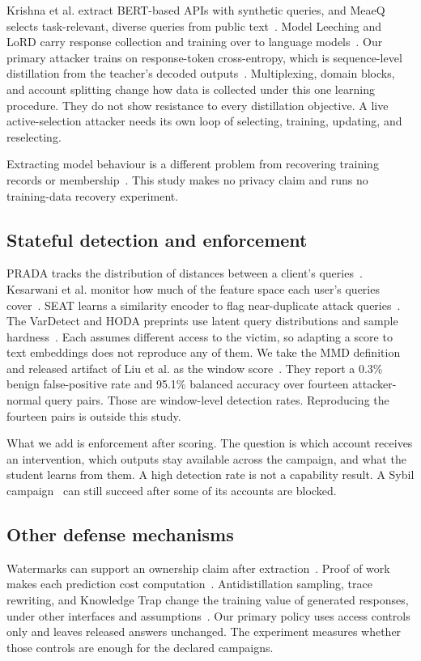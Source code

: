 \documentclass[journal]{IEEEtran}
\begin{document}
Krishna et al. extract BERT-based APIs with synthetic queries, and MeaeQ selects task-relevant, diverse queries from public text~\cite{krishna2020thieves,dai2023meaeq}. Model Leeching and LoRD carry response collection and training over to language models~\cite{birch2023leeching,liang2025lord}. Our primary attacker trains on response-token cross-entropy, which is sequence-level distillation from the teacher's decoded outputs~\cite{kim2016sequence}. Multiplexing, domain blocks, and account splitting change how data is collected under this one learning procedure. They do not show resistance to every distillation objective. A live active-selection attacker needs its own loop of selecting, training, updating, and reselecting.

Extracting model behaviour is a different problem from recovering training records or membership~\cite{carlini2021extracting,shokri2017membership}. This study makes no privacy claim and runs no training-data recovery experiment.

\subsection{Stateful detection and enforcement}
PRADA tracks the distribution of distances between a client's queries~\cite{juuti2019prada}. Kesarwani et al. monitor how much of the feature space each user's queries cover~\cite{kesarwani2018warning}. SEAT learns a similarity encoder to flag near-duplicate attack queries~\cite{zhang2021seat}. The VarDetect and HODA preprints use latent query distributions and sample hardness~\cite{pal2021stateful,sadeghzadeh2022hoda}. Each assumes different access to the victim, so adapting a score to text embeddings does not reproduce any of them. We take the MMD definition and released artifact of Liu et al. as the window score~\cite{liu2026detector,mmd2026artifact}. They report a 0.3\% benign false-positive rate and 95.1\% balanced accuracy over fourteen attacker-normal query pairs. Those are window-level detection rates. Reproducing the fourteen pairs is outside this study.

What we add is enforcement after scoring. The question is which account receives an intervention, which outputs stay available across the campaign, and what the student learns from them. A high detection rate is not a capability result. A Sybil campaign~\cite{douceur2002sybil} can still succeed after some of its accounts are blocked.

\subsection{Other defense mechanisms}
Watermarks can support an ownership claim after extraction~\cite{szyller2021dawn,jia2021entangled}. Proof of work makes each prediction cost computation~\cite{dwork1992pricing,dziedzic2022pow}. Antidistillation sampling, trace rewriting, and Knowledge Trap change the training value of generated responses, under other interfaces and assumptions~\cite{savani2025antidistillation,ma2026tracerewriting,dai2026knowledgetrap}. Our primary policy uses access controls only and leaves released answers unchanged. The experiment measures whether those controls are enough for the declared campaigns.
\end{document}
